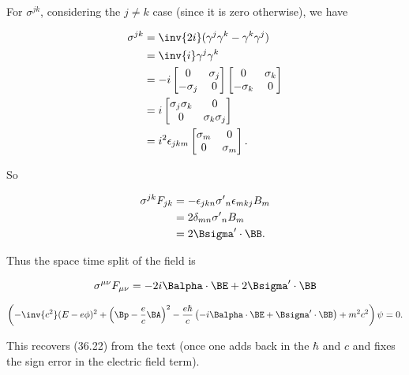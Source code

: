 For $\sigma^{j k}$, considering the $j \ne k$ case (since it is zero otherwise), we have

\begin{align*}
\sigma^{j k} 
&=
\inv{2i} (\gamma^j \gamma^k - \gamma^k \gamma^j) \\
&=
\inv{i} \gamma^j \gamma^k  \\
&=
- i 
\begin{bmatrix}
0 & \sigma_j \\
-\sigma_j & 0
\end{bmatrix}
\begin{bmatrix}
0 & \sigma_k \\
-\sigma_k & 0
\end{bmatrix}
\\
&=
i
\begin{bmatrix}
\sigma_j \sigma_k & 0 \\
0 & \sigma_k \sigma_j 
\end{bmatrix} \\
&=
i^2 \epsilon_{j k m}
\begin{bmatrix}
\sigma_m & 0 \\
0 & \sigma_m
\end{bmatrix}.
\end{align*} 

So

\begin{align*}
\sigma^{j k} F_{j k} 
&= 
- \epsilon_{j k n} {\sigma'}_n 
\epsilon_{m k j} B_m \\
&= 
2 \delta_{m n} {\sigma'}_n B_m \\
&= 
2 \Bsigma' \cdot \BB.
\end{align*}

Thus the space time split of the field is

\begin{equation}\label{eqn:diracCovariant:420}
\sigma^{\mu \nu} F_{\mu \nu}
=
-2 i \Balpha \cdot \BE + 2 \Bsigma' \cdot \BB
\end{equation}

\begin{equation}\label{eqn:diracCovariant:440}
\left( 
-\inv{c^2 } (E - e \phi)^2 + \left(\Bp - \frac{e }{c} \BA \right)^2
- \frac{ e \hbar }{ c } \left( -i \Balpha \cdot \BE + \Bsigma' \cdot \BB \right) + m^2 c^2 \right) \psi  = 0.
\end{equation}

This recovers (36.22) from the text (once one adds back in the $\hbar$ and $c$ and fixes the sign error in the electric field term).

